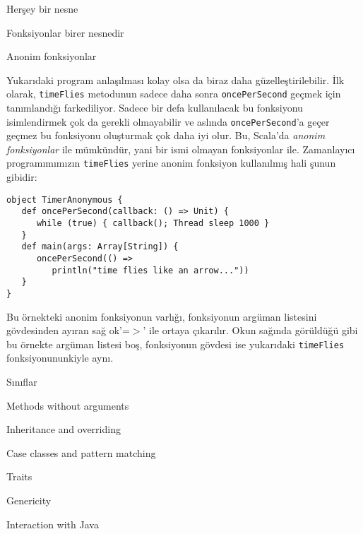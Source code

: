 \documentclass[10pt,a4paper]{book}
\begin{document}
\begin{chapter}{Herşey bir nesne}
\begin{section}{Fonksiyonlar birer nesnedir}
\begin{subsection}{Anonim fonksiyonlar}

Yukarıdaki program anlaşılması kolay olsa da biraz daha güzelleştirilebilir. İlk olarak, \texttt{timeFlies} metodunun sadece daha sonra \texttt{oncePerSecond} geçmek için tanımlandığı farkediliyor. Sadece bir defa kullanılacak bu fonksiyonu isimlendirmek çok da gerekli olmayabilir ve aslında \texttt{oncePerSecond}'a geçer geçmez bu fonksiyonu oluşturmak çok daha iyi olur. Bu, Scala'da \textit{anonim fonksiyonlar} ile mümkündür, yani bir ismi olmayan fonksiyonlar ile. Zamanlayıcı programımımızın \texttt{timeFlies} yerine anonim fonksiyon kullanılmış hali şunun gibidir:

\begin{verbatim}
object TimerAnonymous {
   def oncePerSecond(callback: () => Unit) {
      while (true) { callback(); Thread sleep 1000 }
   }
   def main(args: Array[String]) {
      oncePerSecond(() =>
         println("time flies like an arrow..."))
   }
}
\end{verbatim}

Bu örnekteki anonim fonksiyonun varlığı, fonksiyonun argüman listesini gövdesinden ayıran sağ ok'=$>$' ile ortaya çıkarılır. Okun sağında görüldüğü gibi bu örnekte argüman listesi boş, fonksiyonun gövdesi ise yukarıdaki \texttt{timeFlies} fonksiyonununkiyle aynı.
\end{subsection}

\end{section}

\end{chapter}

\begin{chapter}{Sınıflar}

\begin{section}{Methods without arguments}

\end{section}

\begin{section}{Inheritance and overriding}

\end{section}

\end{chapter}

\begin{chapter}{Case classes and pattern matching}

\end{chapter}

\begin{chapter}{Traits}

\end{chapter}

\begin{chapter}{Genericity}

\end{chapter}

\begin{chapter}{Interaction with Java}

\end{chapter}
\end{document}
